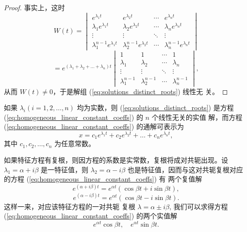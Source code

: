 \begin{proof}
    事实上，这时
$$W(t) = \begin{vmatrix}
e^{\lambda_1 t} & e^{\lambda_2 t} & \cdots & e^{\lambda_n t} \\
\lambda_1 e^{\lambda_1 t} & \lambda_2 e^{\lambda_2 t} & \cdots & \lambda_n e^{\lambda_n t} \\
\vdots & \vdots & \ddots & \vdots \\
\lambda_1^{n-1} e^{\lambda_1 t} & \lambda_2^{n-1} e^{\lambda_2 t} & \cdots & \lambda_n^{n-1} e^{\lambda_n t}
\end{vmatrix}$$
$$= e^{(\lambda_1+\lambda_2+\dots+\lambda_n)t} \begin{vmatrix}
1 & 1 & \cdots & 1 \\
\lambda_1 & \lambda_2 & \cdots & \lambda_n \\
\vdots & \vdots & \ddots & \vdots \\
\lambda_1^{n-1} & \lambda_2^{n-1} & \cdots & \lambda_n^{n-1}
\end{vmatrix},$$
从而 $W(t) \ne 0$，于是解组 (\ref{eq:solutions_distinct_roots}) 线性无
关。

\end{proof}
如果 $\lambda_i (i=1,2,\dots,n)$ 均为实数，则 (\ref{eq:solutions_distinct_roots}) 是方程 (\ref{eq:homogeneous_linear_constant_coeffs}) 的 $n$ 个线性无关的实值
解，而方程 (\ref{eq:homogeneous_linear_constant_coeffs}) 的通解可表示为
$$x=c_1e^{\lambda_1 t}+c_2e^{\lambda_2 t}+\dots+c_ne^{\lambda_n t},$$
其中 $c_1,c_2,\dots,c_n$ 为任意常数。

如果特征方程有复根，则因方程的系数是实常数，复根将成对共轭出现。设 $\lambda_1 =
\alpha+i\beta$ 是一特征值，则 $\lambda_2 = \alpha-i\beta$ 也是特征值，因而与这对共轭复根对应的方程 (\ref{eq:homogeneous_linear_constant_coeffs}) 有
两个复值解
$$e^{(\alpha+i\beta)t} = e^{\alpha t}(\cos \beta t+i\sin \beta t),$$
$$e^{(\alpha-i\beta)t} = e^{\alpha t}(\cos \beta t-i\sin \beta t).$$
这样一来，对应该特征方程的一对共轭
复根 $\lambda = \alpha \pm i\beta$, 我们可以求得方程 (\ref{eq:homogeneous_linear_constant_coeffs}) 的两个实值解
$$e^{\alpha t}\cos \beta t, \quad e^{\alpha t}\sin \beta t.$$

